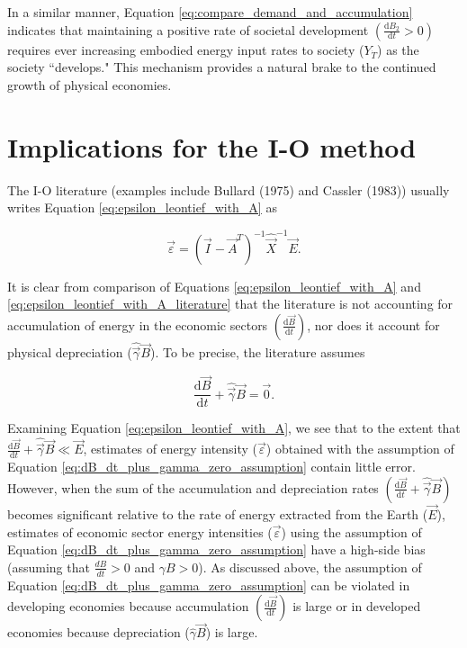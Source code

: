 In a similar manner, Equation \ref{eq:compare_demand_and_accumulation} indicates that maintaining a positive rate of societal development $\left(\frac{\mathrm{d}B_{2}}{\mathrm{d}t} > 0\right)$ requires ever increasing embodied energy input rates to society ($Y_{\dot{T}}$) as the society ``develops." This mechanism provides a natural brake to the continued growth of physical economies.


\section{Implications for the I-O method}

The I-O literature (examples include Bullard (1975) and Cassler (1983)) usually writes Equation \ref{eq:epsilon_leontief_with_A} as

\begin{equation} \label{eq:epsilon_leontief_with_A_literature}
	\vec{\varepsilon} = (\vec{I} - \vec{A}^{T})^{-1}\hat{\vec{X}}^{-1}\vec{E}.
\end{equation}

\noindent It is clear from comparison of Equations \ref{eq:epsilon_leontief_with_A} and \ref{eq:epsilon_leontief_with_A_literature} that the literature is not accounting for accumulation of energy in the economic sectors $\left(\frac{\mathrm{d}\vec{B}}{\mathrm{d}t}\right)$, nor does it account for physical depreciation ($\hat{\vec{\gamma}}\vec{B}$). To be precise, the literature assumes

\begin{equation} \label{eq:dB_dt_plus_gamma_zero_assumption}
	\frac{\mathrm{d}\vec{B}}{\mathrm{d}t} + \hat{\vec{\gamma}}\vec{B} = \vec{0}.
\end{equation}

Examining Equation \ref{eq:epsilon_leontief_with_A}, we see that to the extent that $\frac{\mathrm{d}\vec{B}}{\mathrm{d}t} + \hat{\vec{\gamma}}\vec{B} \ll \vec{E}$, estimates of energy intensity ($\vec{\varepsilon}$) obtained with the assumption of Equation \ref{eq:dB_dt_plus_gamma_zero_assumption} contain little error. However, when the sum of the accumulation and depreciation rates $\left(\frac{\mathrm{d}\vec{B}}{\mathrm{d}t} + \hat{\vec{\gamma}}\vec{B}\right)$ becomes significant relative to the rate of energy extracted from the Earth ($\vec{E}$), estimates of economic sector energy intensities ($\vec{\varepsilon}$) using the assumption of Equation \ref{eq:dB_dt_plus_gamma_zero_assumption} have a high-side bias (assuming that $\frac{dB}{dt} >0$ and $\gamma B > 0$). As discussed above, the assumption of Equation \ref{eq:dB_dt_plus_gamma_zero_assumption} can be violated in developing economies because accumulation $\left(\frac{\mathrm{d}\vec{B}}{\mathrm{d}t}\right)$ is large or in developed economies because depreciation ($\hat{\gamma}\vec{B}$) is large. 

